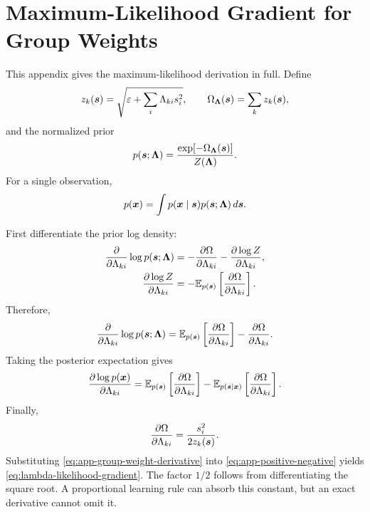 \chapter{Maximum-Likelihood Gradient for Group Weights}
\label{app:group-ml}

This appendix gives the maximum-likelihood derivation in full. Define
\begin{equation}
z_k(\bm{s})=
\sqrt{\varepsilon+\sum_i\Lambda_{ki}s_i^2},
\qquad
\Omega_{\bm{\Lambda}}(\bm{s})=\sum_k z_k(\bm{s}),
\end{equation}
and the normalized prior
\begin{equation}
p(\bm{s};\bm{\Lambda})
=\frac{\exp[-\Omega_{\bm{\Lambda}}(\bm{s})]}
{Z(\bm{\Lambda})}.
\end{equation}
For a single observation,
\begin{equation}
p(\bm{x})=\int p(\bm{x}\mid\bm{s})
p(\bm{s};\bm{\Lambda})\,d\bm{s}.
\end{equation}

First differentiate the prior log density:
\begin{align}
\frac{\partial}{\partial\Lambda_{ki}}
\log p(\bm{s};\bm{\Lambda})
&=-\frac{\partial\Omega}{\partial\Lambda_{ki}}
-\frac{\partial\log Z}{\partial\Lambda_{ki}},\\
\frac{\partial\log Z}{\partial\Lambda_{ki}}
&=-\mathbb{E}_{p(\bm{s})}
\left[\frac{\partial\Omega}{\partial\Lambda_{ki}}\right].
\end{align}
Therefore,
\begin{equation}
\frac{\partial}{\partial\Lambda_{ki}}
\log p(\bm{s};\bm{\Lambda})
=
\mathbb{E}_{p(\bm{s})}
\left[\frac{\partial\Omega}{\partial\Lambda_{ki}}\right]
-\frac{\partial\Omega}{\partial\Lambda_{ki}}.
\end{equation}
Taking the posterior expectation gives
\begin{equation}
\label{eq:app-positive-negative}
\frac{\partial\log p(\bm{x})}{\partial\Lambda_{ki}}
=
\mathbb{E}_{p(\bm{s})}
\left[\frac{\partial\Omega}{\partial\Lambda_{ki}}\right]
-
\mathbb{E}_{p(\bm{s}\mid\bm{x})}
\left[\frac{\partial\Omega}{\partial\Lambda_{ki}}\right].
\end{equation}
Finally,
\begin{equation}
\label{eq:app-group-weight-derivative}
\frac{\partial\Omega}{\partial\Lambda_{ki}}
=\frac{s_i^2}{2z_k(\bm{s})}.
\end{equation}
Substituting \cref{eq:app-group-weight-derivative} into \cref{eq:app-positive-negative} yields \cref{eq:lambda-likelihood-gradient}. The factor $1/2$ follows from differentiating the square root. A proportional learning rule can absorb this constant, but an exact derivative cannot omit it.

